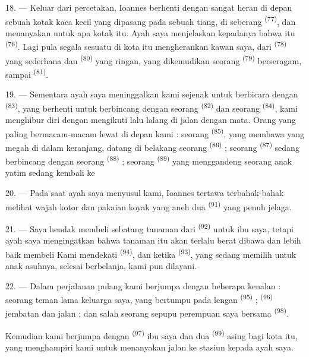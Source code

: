 \VUsaut{3.0mm}

18. --- Keluar dari percetakan, Ioannes berhenti dengan sangat heran
di depan sebuah kotak kaca kecil yang dipasang pada sebuah tiang, di
seberang  \textsuperscript{(77)}, dan menanyakan
untuk apa kotak itu. Ayah saya menjelaskan kepadanya bahwa itu
 \textsuperscript{(76)}. Lagi pula segala
sesuatu di kota itu mengherankan kawan saya, dari  \textsuperscript{(78)} yang sederhana dan  \textsuperscript{(80)} yang ringan, yang dikemudikan
seorang  \textsuperscript{(79)} berseragam, sampai
 \textsuperscript{(81)}.

19. --- Sementara ayah saya meninggalkan kami sejenak untuk berbicara
dengan  \textsuperscript{(83)}, yang berhenti
untuk berbincang dengan seorang 
\textsuperscript{(82)} dan seorang 
\textsuperscript{(84)}, kami menghibur diri dengan mengikuti lalu
lalang di jalan dengan mata. Orang yang paling bermacam-macam lewat di
depan kami : seorang 
\textsuperscript{(85)}, yang membawa  yang megah di
dalam keranjang, datang di belakang seorang 
\textsuperscript{(86)} ; seorang 
\textsuperscript{(87)} sedang berbincang dengan seorang  \textsuperscript{(88)} ; seorang 
\textsuperscript{(89)} yang menggandeng seorang anak yatim sedang
kembali ke 

\VUsaut{3.0mm}

20. --- Pada saat ayah saya menyusul kami, Ioannes tertawa
terbahak-bahak melihat wajah kotor dan pakaian koyak yang aneh dua
 \textsuperscript{(91)} yang penuh jelaga.

21. --- Saya hendak membeli sebatang tanaman dari  \textsuperscript{(92)} untuk ibu saya, tetapi ayah saya
mengingatkan bahwa tanaman itu akan terlalu berat dibawa dan lebih
baik membeli  Kami mendekati 
\textsuperscript{(94)}, dan ketika 
\textsuperscript{(93)}, yang sedang memilih untuk anak asuhnya,
selesai berbelanja, kami pun dilayani.

22. --- Dalam perjalanan pulang kami berjumpa dengan beberapa kenalan
: seorang teman lama keluarga saya, yang bertumpu pada lengan
 \textsuperscript{(95)} ; 
\textsuperscript{(96)} jembatan dan jalan ; dan salah seorang sepupu
perempuan saya bersama 
\textsuperscript{(98)}.

Kemudian kami berjumpa dengan 
\textsuperscript{(97)} ibu saya dan dua 
\textsuperscript{(99)} asing bagi kota itu, yang menghampiri kami untuk
menanyakan jalan ke stasiun kepada ayah saya.

\VUsaut{6.0mm}
\VUfilet{22mm}

